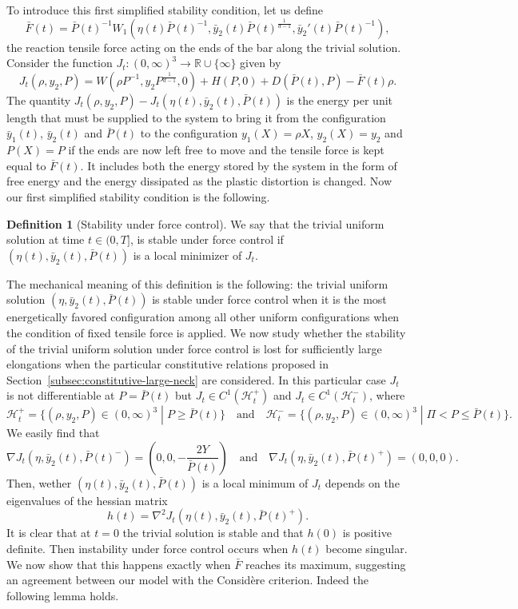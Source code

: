 \documentclass[a4paper,10pt,twoside]{amsbook}
\numberwithin{section}{chapter}
\numberwithin{equation}{chapter}
\theoremstyle{definition}
\newtheorem{defi}[prop]{Definition}
\begin{document}
To introduce this first simplified stability condition, let us define
\[
\bar F(t)=\bar{P}(t)^{-1}W_1(\eta(t)\bar{P}(t)^{-1},\bar{y}_2(t)\bar P(t)^\frac{1}{d-1},\bar{y}_2'(t)\bar{P}(t)^{-1}),
\]
the reaction tensile force acting on the ends of the bar along the trivial solution. Consider the function $J_t\colon(0,\infty)^3\to\mathbb{R}\cup\{\infty\}$ given by
\[
J_t(\rho,y_2,P)=W(\rho P^{-1},y_2P^\frac{1}{d-1},0)+H(P,0)+D(\bar{P}(t),P)-\bar{F}(t)\rho.
\]
The quantity $J_t(\rho,y_2,P)-J_t(\eta(t),\bar{y}_2(t),\bar{P}(t))$ is the energy per unit length that must be supplied to the system to bring it from the configuration $\bar y_1(t)$, $\bar y_2(t)$ and $\bar P(t)$ to the configuration $y_1(X)=\rho X$, $y_2(X)=y_2$ and $P(X)=P$ if the ends are now left free to move and the tensile force is kept equal to $\bar F(t)$. It includes both the energy stored by the system in the form of free energy and the energy dissipated as the plastic distortion is changed. Now our first simplified stability condition is the following.
\begin{defi}[Stability under force control]
We say that the trivial uniform solution at time $t\in(0,T]$, is stable under force control if $(\eta(t),\bar{y}_2(t),\bar{P}(t))$ is a local minimizer of $J_t$.
\end{defi}
The mechanical meaning of this definition is the following: the trivial uniform solution $(\eta,\bar{y}_2(t),\bar{P}(t))$ is stable under force control when it is the most energetically favored configuration among all other uniform configurations when the condition of fixed tensile force is applied. We now study whether the stability of the trivial uniform solution under force control is lost for sufficiently large elongations when the particular constitutive relations proposed in Section~\ref{subsec:constitutive-large-neck} are considered. In this particular case $J_t$ is not differentiable at $P=\bar{P}(t)$ but $J_t\in C^1(\mathscr H^+_t)$ and $J_t\in C^1(\mathscr H^-_t)$, where
\[
\mathscr H^+_t=\{(\rho,y_2,P)\in(0,\infty)^3\;|\;P\ge\bar{P}(t)\}\quad\text{and}\quad \mathscr H^-_t=\{(\rho,y_2,P)\in(0,\infty)^3\;|\;\Pi<P\le\bar{P}(t)\}.
\]
We easily find that
\[
\nabla J_t(\eta,\bar y_2(t),\bar P(t)^-)=\left(0,0,-\frac{2Y}{\bar P(t)}\right)\quad\text{and}\quad\nabla J_t(\eta,\bar y_2(t),\bar P(t)^+)=(0,0,0).
\]
Then, wether $(\eta(t),\bar y_2(t),\bar P(t))$ is a local minimum of $J_t$ depends on the eigenvalues of the hessian matrix
\[
h(t)=\nabla^2 J_t(\eta(t),\bar y_2(t),\bar P(t)^+).
\]
It is clear that at $t=0$ the trivial solution is stable and that $h(0)$ is positive definite. Then instability under force control occurs when $h(t)$ become singular. We now show that this happens exactly when $\bar{F}$ reaches its maximum, suggesting an agreement between our model with the Considère criterion. Indeed the following lemma holds.
\end{document}
